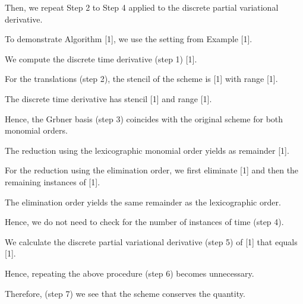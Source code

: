 \documentclass{amsart}
\begin{document}
\noindent   Then, we repeat Step 2 to Step 4 applied to the discrete partial variational derivative.

\noindent   To demonstrate Algorithm [1], we use the setting from Example [1].

\noindent   We compute the discrete time derivative (step 1) [1].

\noindent   For the translations (step 2), the stencil of the scheme is [1] with range [1].

\noindent   The discrete time derivative has stencil [1] and range [1].

\noindent  

\noindent {\color{green} ********************}



\noindent {\color{green} ********************}

\noindent  Hence, the Grbner basis (step 3) coincides with the original scheme for both monomial orders.

\noindent   The reduction using the lexicographic monomial order yields as remainder [1].

\noindent   For the reduction using the elimination order, we first eliminate [1] and then the remaining instances of [1].

\noindent   The elimination order yields the same remainder as the lexicographic order.

\noindent   Hence, we do not need to check for the number of instances of time (step 4).

\noindent   We calculate the discrete partial variational derivative (step 5) of [1] that equals [1].

\noindent   Hence, repeating the above procedure (step 6) becomes unnecessary.

\noindent   Therefore, (step 7) we see that the scheme conserves the quantity.

\noindent  

\noindent {\color{green} ********************}


\end{document}
